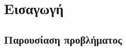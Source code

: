 \documentclass{article}
\begin{document}

\tableofcontents

\section{Εισαγωγή}
\subsection{Παρουσίαση προβλήματος}




\listoffigures
\listoftables

\nocite{*}
\printbibliography
\end{document}
